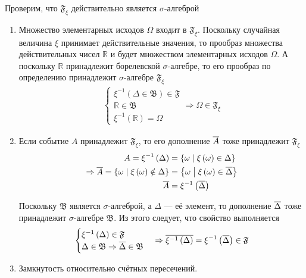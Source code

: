 Проверим, что $\mathfrak{F}_\xi$ действительно является $\sigma$-алгеброй
\begin{enumerate}
  \item Множество элементарных исходов $\Omega$ входит в $\mathfrak{F}_\xi$.
      Поскольку случайная величина $\xi$ принимает действительные значения,
      то прообраз множества действительных чисел $\mathbb{R}$
      и будет множеством элементарных исходов $\Omega$.
      А поскольку $\mathbb{R}$ принадлежит борелевской $\sigma$-алгебре,
      то его прообраз по определению принадлежит
      $\sigma$-алгебре $\mathfrak{F}_\xi$
      \begin{align*}
      \begin{cases}
          \xi^{-1}\left( \Delta \in \mathfrak{B} \right) \in\mathfrak{F}\\
          \mathbb{R}\in\mathfrak{B}\\
          \xi^{-1}\left( \mathbb{R} \right)=\Omega
      \end{cases}
      \Rightarrow
      \Omega \in \mathfrak{F}_\xi
      \end{align*}
  \item Если событие $A$ принадлежит $\mathfrak{F}_\xi$,
      то его дополнение $\overline{A}$ тоже принадлежит $\mathfrak{F}_\xi$
      \begin{align*}
      A=\xi^{-1}\left( \Delta \right)
          &=\left\{ \omega \;\middle|\; \xi\left( \omega \right)
        \in \Delta \right\}\\
      \Rightarrow
      \overline{A}
          =\left\{ \omega \;\middle|\; \xi\left( \omega \right)
        \notin \Delta \right\}
          &=\left\{ \omega \;\middle|\; \xi\left( \omega \right)
        \in \overline{\Delta}\right\}\\
      \overline{A}&=\xi^{-1}\left( \overline{\Delta} \right)
      \end{align*}

      Поскольку $\mathfrak{B}$ является $\sigma$-алгеброй,
      а $\Delta$ --- её элемент,
      то дополнение $\overline{\Delta}$ тоже принадлежит
      $\sigma$-алгебре $\mathfrak{B}$.
      Из этого следует, что свойство выполняется
      \begin{align*}
      \begin{cases}
          \xi^{-1}\left( \Delta \right) \in \mathfrak{F}\\
          \Delta \in \mathfrak{B}
        \Rightarrow \overline{\Delta} \in \mathfrak{B}
      \end{cases}
      \Rightarrow
      \overline{\xi^{-1}\left( \Delta \right)}
          =\xi^{-1}\left( \overline{\Delta} \right) \in \mathfrak{F}
      \end{align*}
  \item Замкнутость относительно счётных пересечений.


\end{enumerate}
